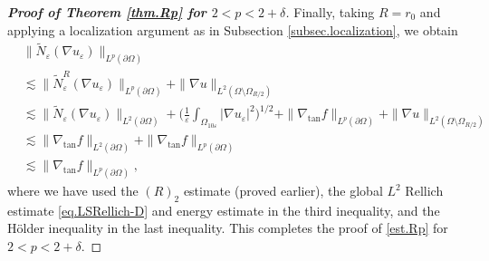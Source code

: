 \documentclass[reqno,12pt]{amsart} %
\theoremstyle{definition}
\theoremstyle{remark}
\numberwithin{equation}{section}
\newcommand{\e}{\varepsilon}
\begin{document}
\begin{proof}[\textbf{Proof of Theorem \ref{thm.Rp} for $2<p<2+\delta$}]
Finally, taking $R = r_0$ and applying a localization argument as in Subsection \ref{subsec.localization}, we obtain
 \begin{equation}
 \begin{aligned}
    &\| \widetilde{N}_\e(\nabla u_\e) \|_{L^p(\partial \Omega)} \\
    & \lesssim \| \widetilde{N}_\e^R(\nabla u_\e) \|_{L^p(\partial \Omega)} + \| \nabla u \|_{L^2(\Omega\setminus \Omega_{R/2})} \\
    & \lesssim \| \widetilde{N}_\e(\nabla u_\e) \|_{L^2(\partial \Omega)} + \bigg( \frac{1}{\e} \int_{\Omega_{10\e}} |\nabla u_\e|^2 \bigg)^{1/2} + \| \nabla_{\tan} f \|_{L^p(\partial \Omega)} + \| \nabla u \|_{L^2(\Omega\setminus \Omega_{R/2})} \\
    & \lesssim \| \nabla_{\tan} f \|_{L^2(\partial \Omega)} + \| \nabla_{\tan} f \|_{L^p(\partial \Omega)} \\
    & \lesssim \| \nabla_{\tan} f \|_{L^p(\partial \Omega)},
 \end{aligned}
 \end{equation}
 where we have used the $(R)_2$ estimate (proved earlier),  the global $L^2$ Rellich estimate \eqref{eq.LSRellich-D} and energy estimate in the third inequality, and the H\"{o}lder inequality in the last inequality. This completes the proof of \eqref{est.Rp} for $2<p<2+\delta$.
\end{proof}
\end{document}
